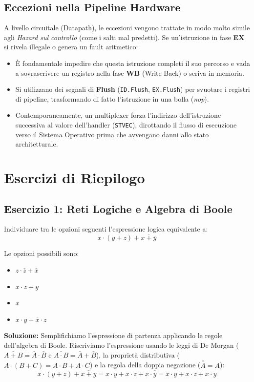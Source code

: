 \documentclass[12pt, a4paper]{article}
\begin{document}
\subsection{Eccezioni nella Pipeline Hardware}
A livello circuitale (Datapath), le eccezioni vengono trattate in modo molto simile agli \textit{Hazard sul controllo} (come i salti mal predetti). 
Se un'istruzione in fase \textbf{EX} si rivela illegale o genera un fault aritmetico:
\begin{itemize}
    \item È fondamentale impedire che questa istruzione completi il suo percorso e vada a sovrascrivere un registro nella fase \textbf{WB} (Write-Back) o scriva in memoria.
    \item Si utilizzano dei segnali di \textbf{Flush} (\texttt{ID.Flush}, \texttt{EX.Flush}) per svuotare i registri di pipeline, trasformando di fatto l'istruzione in una bolla (\textit{nop}).
    \item Contemporaneamente, un multiplexer forza l'indirizzo dell'istruzione successiva al valore dell'handler (\texttt{STVEC}), dirottando il flusso di esecuzione verso il Sistema Operativo prima che avvengano danni allo stato architetturale.
\end{itemize}

\newpage

\section{Esercizi di Riepilogo}

\subsection{Esercizio 1: Reti Logiche e Algebra di Boole}
Individuare tra le opzioni seguenti l'espressione logica equivalente a:
$$x \cdot (y+z) + \overline{x+\overline{y}}$$

Le opzioni possibili sono:
\begin{itemize}
    \item $z \cdot \overline{z} + \overline{x}$
    \item $x \cdot z + y$
    \item $x$
    \item $x \cdot y + \overline{x} \cdot z$
\end{itemize}

\textbf{Soluzione:}
Semplifichiamo l'espressione di partenza applicando le regole dell'algebra di Boole.
Riscriviamo l'espressione usando le leggi di De Morgan ($\overline{A+B} = \overline{A} \cdot \overline{B}$ e $\overline{A \cdot B} = \overline{A} + \overline{B}$), la proprietà distributiva ($A \cdot (B+C) = A \cdot B + A \cdot C$) e la regola della doppia negazione ($\overline{\overline{A}} = A$):
$$x \cdot (y+z) + \overline{x+\overline{y}} = x \cdot y + x \cdot z + \overline{x} \cdot \overline{\overline{y}} = x \cdot y + x \cdot z + \overline{x} \cdot y$$
\end{document}
